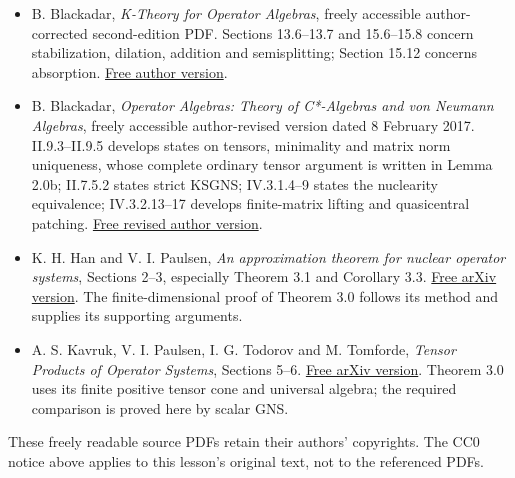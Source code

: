 \documentclass[
  11pt,
]{article}
\begin{document}
\begin{itemize}
\item
  B. Blackadar, \emph{K-Theory for Operator Algebras}, freely accessible
  author-corrected second-edition PDF. Sections 13.6--13.7 and
  15.6--15.8 concern stabilization, dilation, addition and
  semisplitting; Section 15.12 concerns absorption.
  \href{https://www.bruceblackadar.com/Mathematics/book6.pdf}{Free
  author version}.
\item
  B. Blackadar, \emph{Operator Algebras: Theory of C*-Algebras and von
  Neumann Algebras}, freely accessible author-revised version dated 8
  February 2017. II.9.3--II.9.5 develops states on tensors, minimality
  and matrix norm uniqueness, whose complete ordinary tensor argument is
  written in Lemma 2.0b; II.7.5.2 states strict KSGNS; IV.3.1.4--9
  states the nuclearity equivalence; IV.3.2.13--17 develops
  finite-matrix lifting and quasicentral patching.
  \href{https://www.bruceblackadar.com/Mathematics/Cycr.pdf}{Free
  revised author version}.
\item
  K. H. Han and V. I. Paulsen, \emph{An approximation theorem for
  nuclear operator systems}, Sections 2--3, especially Theorem 3.1 and
  Corollary 3.3. \href{https://arxiv.org/pdf/1009.2541}{Free arXiv
  version}. The finite-dimensional proof of Theorem 3.0 follows its
  method and supplies its supporting arguments.
\item
  A. S. Kavruk, V. I. Paulsen, I. G. Todorov and M. Tomforde,
  \emph{Tensor Products of Operator Systems}, Sections 5--6.
  \href{https://arxiv.org/pdf/0910.2210}{Free arXiv version}. Theorem
  3.0 uses its finite positive tensor cone and universal algebra; the
  required comparison is proved here by scalar GNS.
\end{itemize}

These freely readable source PDFs retain their authors' copyrights. The
CC0 notice above applies to this lesson's original text, not to the
referenced PDFs.
\end{document}
